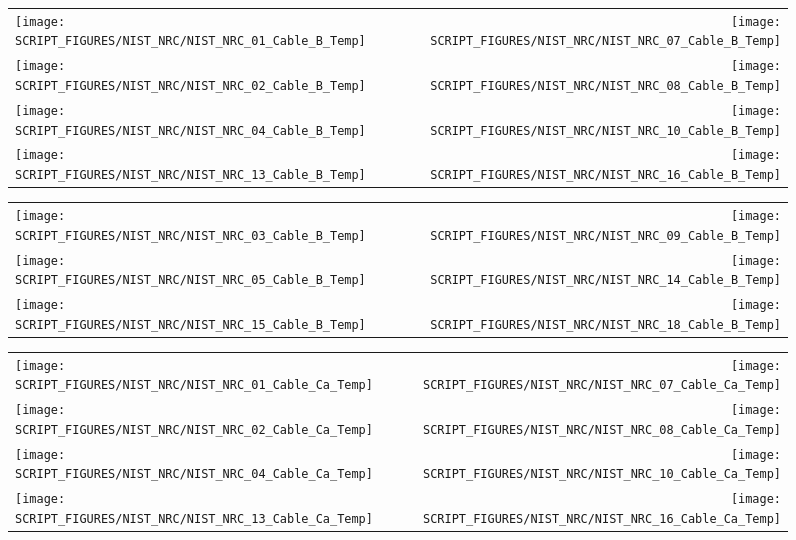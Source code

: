 \begin{figure}[p]
\begin{tabular*}{\textwidth}{l@{\extracolsep{\fill}}r}
\texttt{[image: SCRIPT\_FIGURES/NIST\_NRC/NIST\_NRC\_01\_Cable\_B\_Temp]} &
\texttt{[image: SCRIPT\_FIGURES/NIST\_NRC/NIST\_NRC\_07\_Cable\_B\_Temp]} \\
\texttt{[image: SCRIPT\_FIGURES/NIST\_NRC/NIST\_NRC\_02\_Cable\_B\_Temp]} &
\texttt{[image: SCRIPT\_FIGURES/NIST\_NRC/NIST\_NRC\_08\_Cable\_B\_Temp]} \\
\texttt{[image: SCRIPT\_FIGURES/NIST\_NRC/NIST\_NRC\_04\_Cable\_B\_Temp]} &
\texttt{[image: SCRIPT\_FIGURES/NIST\_NRC/NIST\_NRC\_10\_Cable\_B\_Temp]} \\
\texttt{[image: SCRIPT\_FIGURES/NIST\_NRC/NIST\_NRC\_13\_Cable\_B\_Temp]} &
\texttt{[image: SCRIPT\_FIGURES/NIST\_NRC/NIST\_NRC\_16\_Cable\_B\_Temp]}
\end{tabular*}
\label{NIST_NRC_Cable_B_Closed}
\end{figure}

\begin{figure}[p]
\begin{tabular*}{\textwidth}{l@{\extracolsep{\fill}}r}
\texttt{[image: SCRIPT\_FIGURES/NIST\_NRC/NIST\_NRC\_03\_Cable\_B\_Temp]} &
\texttt{[image: SCRIPT\_FIGURES/NIST\_NRC/NIST\_NRC\_09\_Cable\_B\_Temp]} \\
\texttt{[image: SCRIPT\_FIGURES/NIST\_NRC/NIST\_NRC\_05\_Cable\_B\_Temp]} &
\texttt{[image: SCRIPT\_FIGURES/NIST\_NRC/NIST\_NRC\_14\_Cable\_B\_Temp]} \\
\texttt{[image: SCRIPT\_FIGURES/NIST\_NRC/NIST\_NRC\_15\_Cable\_B\_Temp]} &
\texttt{[image: SCRIPT\_FIGURES/NIST\_NRC/NIST\_NRC\_18\_Cable\_B\_Temp]}
\end{tabular*}
\label{NIST_NRC_Cable_B_Open}
\end{figure}

\begin{figure}[p]
\begin{tabular*}{\textwidth}{l@{\extracolsep{\fill}}r}
\texttt{[image: SCRIPT\_FIGURES/NIST\_NRC/NIST\_NRC\_01\_Cable\_Ca\_Temp]} &
\texttt{[image: SCRIPT\_FIGURES/NIST\_NRC/NIST\_NRC\_07\_Cable\_Ca\_Temp]} \\
\texttt{[image: SCRIPT\_FIGURES/NIST\_NRC/NIST\_NRC\_02\_Cable\_Ca\_Temp]} &
\texttt{[image: SCRIPT\_FIGURES/NIST\_NRC/NIST\_NRC\_08\_Cable\_Ca\_Temp]} \\
\texttt{[image: SCRIPT\_FIGURES/NIST\_NRC/NIST\_NRC\_04\_Cable\_Ca\_Temp]} &
\texttt{[image: SCRIPT\_FIGURES/NIST\_NRC/NIST\_NRC\_10\_Cable\_Ca\_Temp]} \\
\texttt{[image: SCRIPT\_FIGURES/NIST\_NRC/NIST\_NRC\_13\_Cable\_Ca\_Temp]} &
\texttt{[image: SCRIPT\_FIGURES/NIST\_NRC/NIST\_NRC\_16\_Cable\_Ca\_Temp]}
\end{tabular*}
\label{NIST_NRC_Cable_Ca_Closed}
\end{figure}

